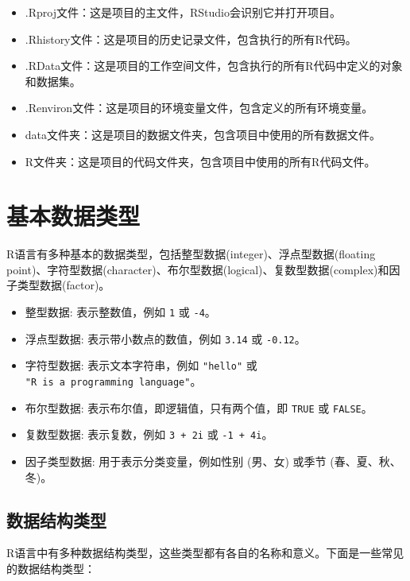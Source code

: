 \documentclass[
  letterpaper,
  DIV=11,
  numbers=noendperiod]{scrreprt}
\providecommand{\tightlist}{%
  \setlength{\itemsep}{0pt}\setlength{\parskip}{0pt}}\usepackage{longtable,booktabs,array}
\begin{document}
\begin{itemize}
\tightlist
\item
  .Rproj文件：这是项目的主文件，RStudio会识别它并打开项目。
\item
  .Rhistory文件：这是项目的历史记录文件，包含执行的所有R代码。
\item
  .RData文件：这是项目的工作空间文件，包含执行的所有R代码中定义的对象和数据集。
\item
  .Renviron文件：这是项目的环境变量文件，包含定义的所有环境变量。
\item
  data文件夹：这是项目的数据文件夹，包含项目中使用的所有数据文件。
\item
  R文件夹：这是项目的代码文件夹，包含项目中使用的所有R代码文件。
\end{itemize}

\hypertarget{ux57faux672cux6570ux636eux7c7bux578b}{%
\chapter{基本数据类型}\label{ux57faux672cux6570ux636eux7c7bux578b}}

R语言有多种基本的数据类型，包括整型数据(integer)、浮点型数据(floating
point)、字符型数据(character)、布尔型数据(logical)、复数型数据(complex)和因子类型数据(factor)。

\begin{itemize}
\tightlist
\item
  整型数据: 表示整数值，例如 \texttt{1} 或 \texttt{-4}。
\item
  浮点型数据: 表示带小数点的数值，例如 \texttt{3.14} 或 \texttt{-0.12}。
\item
  字符型数据: 表示文本字符串，例如 \texttt{"hello"} 或
  \texttt{"R\ is\ a\ programming\ language"}。
\item
  布尔型数据: 表示布尔值，即逻辑值，只有两个值，即 \texttt{TRUE} 或
  \texttt{FALSE}。
\item
  复数型数据: 表示复数，例如 \texttt{3\ +\ 2i} 或 \texttt{-1\ +\ 4i}。
\item
  因子类型数据: 用于表示分类变量，例如性别 (男、女) 或季节
  (春、夏、秋、冬)。
\end{itemize}

\hypertarget{ux6570ux636eux7ed3ux6784ux7c7bux578b}{%
\section{数据结构类型}\label{ux6570ux636eux7ed3ux6784ux7c7bux578b}}

R语言中有多种数据结构类型，这些类型都有各自的名称和意义。下面是一些常见的数据结构类型：
\end{document}
